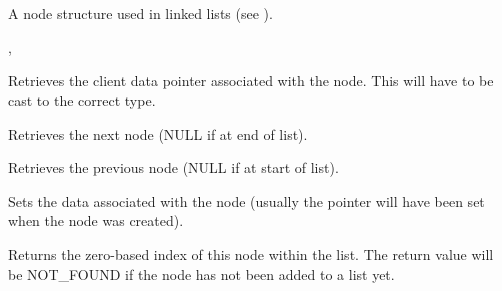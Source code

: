 \section{}\label{wxnode}

A node structure used in linked lists (see ).




, 




Retrieves the client data pointer associated with the node. This will
have to be cast to the correct type.



Retrieves the next node (NULL if at end of list).



Retrieves the previous node (NULL if at start of list).



Sets the data associated with the node (usually the pointer will have been
set when the node was created).



Returns the zero-based index of this node within the list. The return value
will be NOT\_FOUND if the node has not been added to a list yet.


